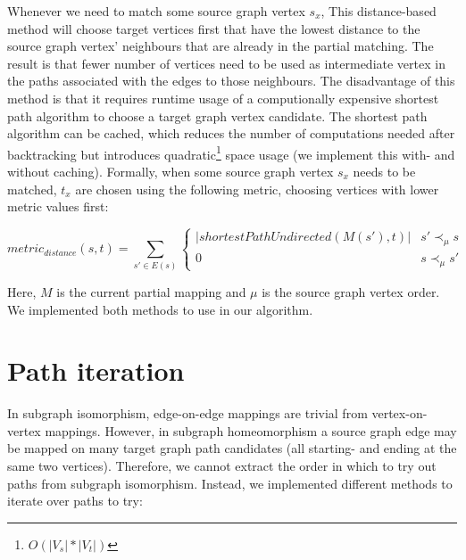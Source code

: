 Whenever we need to match some source graph vertex $s_x$, This distance-based method will choose target vertices first that have the lowest distance to the source graph vertex' neighbours that are already in the partial matching. The result is that fewer number of vertices need to be used as intermediate vertex in the paths associated with the edges to those neighbours. The disadvantage of this method is that it requires runtime usage of a computionally expensive shortest path algorithm to choose a target graph vertex candidate. The shortest path algorithm can be cached, which reduces the number of computations needed after backtracking but introduces quadratic\footnote{$O(|V_s|*|V_t|)$} space usage (we implement this with- and without caching). Formally, when some source graph vertex $s_x$ needs to be matched, $t_x$ are chosen using the following metric, choosing vertices with lower metric values first:


$$\mathit{metric}_\mathit{distance}(s, t)=\sum_{s' \in E(s)} \begin{cases}
|\mathit{shortestPathUndirected}(M(s'), t)| & s' \prec_\mu s\\
0 & s \prec_\mu s'
\end{cases}$$

Here, $M$ is the current partial mapping and $\mu$ is the source graph vertex order. We implemented both methods to use in our algorithm.

\section{Path iteration}
\label{sec:pathIteration}
In subgraph isomorphism, edge-on-edge mappings are trivial from vertex-on-vertex mappings. However, in subgraph homeomorphism a source graph edge may be mapped on many target graph path candidates (all starting- and ending at the same two vertices). Therefore, we cannot extract the order in which to try out paths from subgraph isomorphism. Instead, we implemented different methods to iterate over paths to try:

